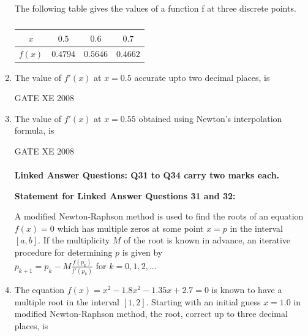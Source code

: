 \documentclass[12pt]{article}
\begin{document}
\begin{enumerate}[label=Q\arabic*.]
The following table gives the values of a function f at three discrete points.

\begin{table}[H]     \centering     \caption{}     \label{}     \begin{tabular}{|c|c|c|c|}
    \hline
    $x$ & $0.5$ & $0.6$ & $0.7$ \\
    \hline
    $f(x)$ & $0.4794$ & $0.5646$ & $0.4662$ \\
    \hline
\end{tabular} \end{table}
\item The value of $f'(x)$ at $x = 0.5$ accurate upto two decimal places, is

\begin{enumerate}[label=(\Alph*)]
\end{enumerate}

GATE XE 2008
\item  The value of $f'(x)$ at $x =0.55$ obtained using Newton's interpolation formula, is

\begin{enumerate}[label=(\Alph*)]
\end{enumerate}

GATE XE 2008
\\
\\
\noindent \textbf{\large Linked Answer Questions: Q31 to Q34 carry two marks each.}

\textbf{Statement for Linked Answer Questions 31 and 32:}

A modified Newton-Raphson method is used to find the roots of an equation $f(x)= 0$ which has multiple zeros at some point $x = p$ in the interval $[a,b]$. If the multiplicity $M$ of the root is known in advance, an iterative procedure for determining $p$ is given by \newline \\
$p_{k+1} = p_{k} - M\frac{f(p_{k})}{f'(p_{k})}$ for $k=0,1,2,...$
\\
\item  The equation $f(x)=x^2-1.8x^2 -1.35x+2.7= 0$ is known to have a multiple root in the
interval $[1,2]$. Starting with an initial guess $x =1.0$ in modified Newton-Raphson method, the root, correct up to three decimal places, is


\end{enumerate}
\end{document}
